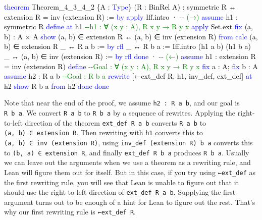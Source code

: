 \documentclass[
  letterpaper,
  DIV=11,
  numbers=noendperiod]{scrreprt}
\newenvironment{Shaded}{\begin{snugshade}}{\end{snugshade}}
\newcommand{\CommentTok}[1]{\textcolor[rgb]{0.37,0.37,0.37}{#1}}
\newcommand{\KeywordTok}[1]{\textcolor[rgb]{0.00,0.23,0.31}{#1}}
\newcommand{\NormalTok}[1]{\textcolor[rgb]{0.00,0.23,0.31}{#1}}
\renewcommand{\NormalTok}[1]{\textcolor[HTML]{000000}{#1}}
\renewcommand{\KeywordTok}[1]{\textcolor[HTML]{0000FF}{#1}}
\renewcommand{\CommentTok}[1]{\textcolor[HTML]{008000}{#1}}
\theoremstyle{remark}
\begin{document}
\begin{Shaded}
\begin{Highlighting}[]
\KeywordTok{theorem}\NormalTok{ Theorem\_4\_3\_4\_2 \{A : }\KeywordTok{Type}\NormalTok{\} (R : BinRel A) :}
\NormalTok{    symmetric R ↔ extension R = inv (extension R) := }\KeywordTok{by}
  \KeywordTok{apply}\NormalTok{ Iff.intro}
\NormalTok{  · }\CommentTok{{-}{-} (→)}
    \KeywordTok{assume}\NormalTok{ h1 : symmetric R}
    \KeywordTok{define} \KeywordTok{at}\NormalTok{ h1             }\CommentTok{{-}{-}h1 : ∀ (x y : A), R x y → R y x}
    \KeywordTok{apply}\NormalTok{ Set.ext}
    \KeywordTok{fix}\NormalTok{ (a, b) : A × A}
    \KeywordTok{show}\NormalTok{ (a, b) ∈ extension R ↔ (a, b) ∈ inv (extension R) }\KeywordTok{from}
      \KeywordTok{calc}\NormalTok{ (a, b) ∈ extension R}
\NormalTok{        \_ ↔ R a b := }\KeywordTok{by} \KeywordTok{rfl}
\NormalTok{        \_ ↔ R b a := Iff.intro (h1 a b) (h1 b a)}
\NormalTok{        \_ ↔ (a, b) ∈ inv (extension R) := }\KeywordTok{by} \KeywordTok{rfl}
    \KeywordTok{done}
\NormalTok{  · }\CommentTok{{-}{-} (←)}
    \KeywordTok{assume}\NormalTok{ h1 : extension R = inv (extension R)}
    \KeywordTok{define}                   \CommentTok{{-}{-}Goal : ∀ (x y : A), R x y → R y x}
    \KeywordTok{fix}\NormalTok{ a : A; }\KeywordTok{fix}\NormalTok{ b : A}
    \KeywordTok{assume}\NormalTok{ h2 : R a b        }\CommentTok{{-}{-}Goal : R b a}
    \KeywordTok{rewrite}\NormalTok{ [←ext\_def R, h1, inv\_def, ext\_def] }\KeywordTok{at}\NormalTok{ h2}
    \KeywordTok{show}\NormalTok{ R b a }\KeywordTok{from}\NormalTok{ h2}
    \KeywordTok{done}
  \KeywordTok{done}
\end{Highlighting}
\end{Shaded}

Note that near the end of the proof, we assume \texttt{h2\ :\ R\ a\ b},
and our goal is \texttt{R\ b\ a}. We convert \texttt{R\ a\ b} to
\texttt{R\ b\ a} by a sequence of rewrites. Applying the right-to-left
direction of the theorem \texttt{ext\_def\ R\ a\ b} converts
\texttt{R\ a\ b} to \texttt{(a,\ b)\ ∈\ extension\ R}. Then rewriting
with \texttt{h1} converts this to
\texttt{(a,\ b)\ ∈\ inv\ (extension\ R)}, using
\texttt{inv\_def\ (extension\ R)\ b\ a} converts this to
\texttt{(b,\ a)\ ∈\ extension\ R}, and finally
\texttt{ext\_def\ R\ b\ a} produces \texttt{R\ b\ a}. Usually we can
leave out the arguments when we use a theorem as a rewriting rule, and
Lean will figure them out for itself. But in this case, if you try using
\texttt{←ext\_def} as the first rewriting rule, you will see that Lean
is unable to figure out that it should use the right-to-left direction
of \texttt{ext\_def\ R\ a\ b}. Supplying the first argument turns out to
be enough of a hint for Lean to figure out the rest. That's why our
first rewriting rule is \texttt{←ext\_def\ R}.
\end{document}
